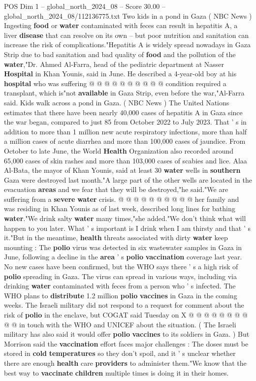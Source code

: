 \begin{textsample}{POS Dim 1 – global\_north\_2024\_08 – Score 30.00 – global\_north\_2024\_08/112136775.txt}
Two kids in a pond in Gaza ( NBC News ) Ingesting \textbf{food} or \textbf{water} contaminated with feces can result in hepatitis A, a liver \textbf{disease} that can resolve on its own -- but poor nutrition and sanitation can increase the risk of complications."Hepatitis A is widely spread nowadays in Gaza Strip due to bad sanitation and bad quality of \textbf{food} and the pollution of the \textbf{water},"Dr.
Ahmed Al-Farra, head of the pediatric department at Nasser \textbf{Hospital} in Khan Younis, said in June.
He described a 4-year-old boy at his \textbf{hospital} who was suffering @ @ @ @ @ @ @ @ @ @ condition required a transplant, which is"not \textbf{available} in Gaza Strip, even before the war,"Al-Farra said.
Kids walk across a pond in Gaza. ( NBC News ) The United Nations estimates that there have been nearly 40,000 cases of hepatitis A in Gaza since the war began, compared to just 85 from October 2022 to July 2023.
That ' s in addition to more than 1 million new acute respiratory infections, more than half a million cases of acute diarrhea and more than 100,000 cases of jaundice.
From October to late June, the World \textbf{Health} Organization also recorded around 65,000 cases of skin rashes and more than 103,000 cases of scabies and lice.
Alaa Al-Bata, the mayor of Khan Younis, said at least 30 \textbf{water} wells in \textbf{southern} Gaza were destroyed last month."A large part of the other wells are located in the evacuation \textbf{areas} and we fear that they will be destroyed,"he said."We are suffering from a \textbf{severe} \textbf{water} crisis. @ @ @ @ @ @ @ @ @ @ her family and was residing in Khan Younis as of last week, described long lines for bathing \textbf{water}."We drink salty \textbf{water} many times,"she added."We don't think what will happen to you later.
What ' s important is I drink when I am thirsty and that ' s it."But in the meantime, \textbf{health} threats associated with dirty \textbf{water} keep mounting : The \textbf{polio} virus was detected in six wastewater samples in Gaza in June, following a decline in the \textbf{area} ' s \textbf{polio} \textbf{vaccination} coverage last year.
No new cases have been confirmed, but the WHO says there ' s a high risk of \textbf{polio} spreading in Gaza.
The virus can spread in various ways, including via drinking \textbf{water} contaminated with feces from a person who ' s infected.
The WHO plans to \textbf{distribute} 1.2 million \textbf{polio} \textbf{vaccines} in Gaza in the coming weeks.
The Israeli military did not respond to a request for comment about the risk of \textbf{polio} in the enclave, but COGAT said Tuesday on X @ @ @ @ @ @ @ @ @ @ in touch with the WHO and UNICEF about the situation. ( The Israeli military has also said it would offer \textbf{polio} \textbf{vaccines} to its soldiers in Gaza. ) But Morrison said the \textbf{vaccination} effort faces major challenges : The doses must be stored in \textbf{cold} \textbf{temperatures} so they don't spoil, and it ' s unclear whether there are enough \textbf{health} care \textbf{providers} to administer them."We know that the best way to \textbf{vaccinate} \textbf{children} multiple times is doing it in their homes.

\end{textsample}
